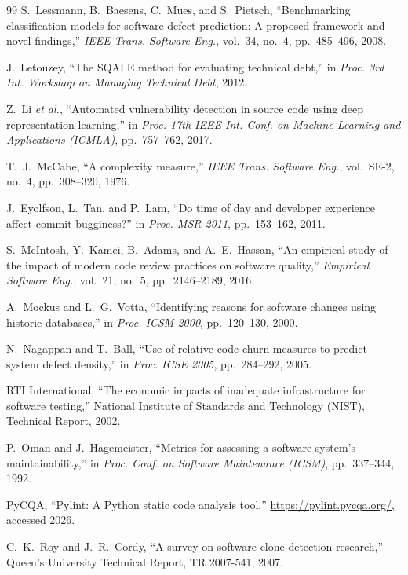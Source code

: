\documentclass[12pt, oneside]{report}
\begin{document}
\begin{thebibliography}{99}
S.~Lessmann, B.~Baesens, C.~Mues, and S.~Pietsch,
``Benchmarking classification models for software defect prediction:
A proposed framework and novel findings,''
\textit{IEEE Trans. Software Eng.}, vol.~34, no.~4, pp.~485--496, 2008.

J.~Letouzey,
``The SQALE method for evaluating technical debt,''
in \textit{Proc. 3rd Int. Workshop on Managing Technical Debt}, 2012.

Z.~Li \textit{et al.},
``Automated vulnerability detection in source code using deep representation learning,''
in \textit{Proc. 17th IEEE Int. Conf. on Machine Learning and Applications (ICMLA)},
pp.~757--762, 2017.

T.~J.~McCabe,
``A complexity measure,''
\textit{IEEE Trans. Software Eng.}, vol.~SE-2, no.~4, pp.~308--320, 1976.

J.~Eyolfson, L.~Tan, and P.~Lam,
``Do time of day and developer experience affect commit bugginess?''
in \textit{Proc. MSR 2011}, pp.~153--162, 2011.

S.~McIntosh, Y.~Kamei, B.~Adams, and A.~E.~Hassan,
``An empirical study of the impact of modern code review practices on software quality,''
\textit{Empirical Software Eng.}, vol.~21, no.~5, pp.~2146--2189, 2016.

A.~Mockus and L.~G.~Votta,
``Identifying reasons for software changes using historic databases,''
in \textit{Proc. ICSM 2000}, pp.~120--130, 2000.

N.~Nagappan and T.~Ball,
``Use of relative code churn measures to predict system defect density,''
in \textit{Proc. ICSE 2005}, pp.~284--292, 2005.

RTI International,
``The economic impacts of inadequate infrastructure for software testing,''
National Institute of Standards and Technology (NIST), Technical Report, 2002.

P.~Oman and J.~Hagemeister,
``Metrics for assessing a software system's maintainability,''
in \textit{Proc. Conf. on Software Maintenance (ICSM)}, pp.~337--344, 1992.

PyCQA,
``Pylint: A Python static code analysis tool,''
\url{https://pylint.pycqa.org/}, accessed 2026.

C.~K.~Roy and J.~R.~Cordy,
``A survey on software clone detection research,''
Queen's University Technical Report, TR 2007-541, 2007.


\end{thebibliography}
\end{document}
